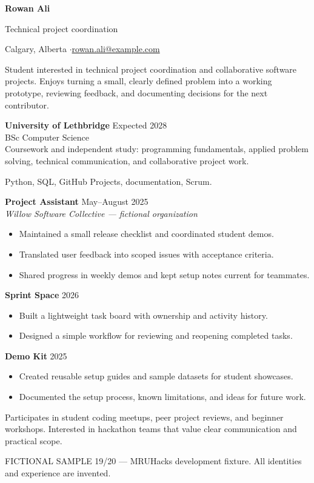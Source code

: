 
{\Huge\bfseries Rowan Ali}\par
{\large\color{accent} Technical project coordination}\par
Calgary, Alberta \enspace$\cdot$\enspace \href{mailto:rowan.ali@example.com}{rowan.ali@example.com}

Student interested in technical project coordination and collaborative software projects.
Enjoys turning a small, clearly defined problem into a working prototype,
reviewing feedback, and documenting decisions for the next contributor.

\textbf{University of Lethbridge} \hfill Expected 2028\\
BSc Computer Science\\
Coursework and independent study: programming fundamentals, applied problem solving,
technical communication, and collaborative project work.

Python, SQL, GitHub Projects, documentation, Scrum.

\textbf{Project Assistant} \hfill May--August 2025\\
\textit{Willow Software Collective --- fictional organization}
\begin{itemize}
\item Maintained a small release checklist and coordinated student demos.
\item Translated user feedback into scoped issues with acceptance criteria.
\item Shared progress in weekly demos and kept setup notes current for teammates.
\end{itemize}

\textbf{Sprint Space} \hfill 2026
\begin{itemize}
\item Built a lightweight task board with ownership and activity history.
\item Designed a simple workflow for reviewing and reopening completed tasks.
\end{itemize}
\textbf{Demo Kit} \hfill 2025
\begin{itemize}
\item Created reusable setup guides and sample datasets for student showcases.
\item Documented the setup process, known limitations, and ideas for future work.
\end{itemize}

Participates in student coding meetups, peer project reviews, and beginner workshops.
Interested in hackathon teams that value clear communication and practical scope.

\vfill
{\footnotesize\color{gray} FICTIONAL SAMPLE 19/20 --- MRUHacks development fixture.
All identities and experience are invented.}


